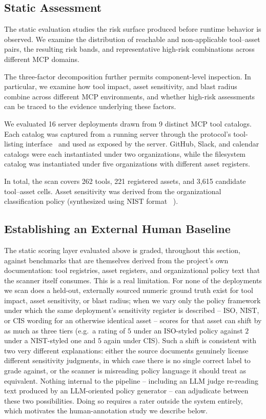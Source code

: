 \documentclass[sigconf]{acmart}
\begin{document}
\subsection{Static Assessment}
\label{sec:static-eval}

The static evaluation studies the risk surface produced before runtime
behavior is observed. We examine the distribution of reachable and
non-applicable tool--asset pairs, the resulting risk bands, and
representative high-risk combinations across different MCP domains.

The three-factor decomposition further permits component-level inspection. In particular, we examine how tool impact, asset sensitivity, and blast radius combine across different MCP environments, and whether high-risk assessments can be traced to the evidence underlying these factors.

We evaluated 16 server deployments drawn from 9 distinct MCP tool catalogs.
Each catalog was captured from a running server through the protocol's
tool-listing interface~\cite{mcp2026spec} and used as exposed by the server.
GitHub, Slack, and calendar catalogs were each instantiated under two
organizations, while the filesystem catalog was instantiated under five
organizations with different asset registers.

In total, the scan covers 262 tools, 221 registered assets, and
3,615 candidate tool--asset cells. Asset sensitivity was derived from
the organizational classification policy (synthesized using NIST format ~\cite{nist2008sp80060}).


\subsection{Establishing an External Human Baseline}
\label{sec:human-annotation}

The static scoring layer evaluated above is graded, throughout this section, against benchmarks that are themselves derived from the project's own documentation: tool registries, asset registers, and organizational policy text that the scanner itself consumes. This is a real limitation. For none of the deployments we scan does a held-out, externally sourced numeric ground truth exist for tool impact, asset sensitivity, or blast radius; when we vary only the policy framework under which the same deployment's sensitivity register is described -- ISO, NIST, or CIS wording for an otherwise identical asset -- scores for that asset can shift by as much as three tiers (e.g.\ a rating of $5$ under an ISO-styled policy against $2$ under a NIST-styled one and $5$ again under CIS). Such a shift is consistent with two very different explanations: either the source documents genuinely license different sensitivity judgments, in which case there is no single correct label to grade against, or the scanner is misreading policy language it should treat as equivalent. Nothing internal to the pipeline -- including an LLM judge re-reading text produced by an LLM-oriented policy generator -- can adjudicate between these two possibilities. Doing so requires a rater outside the system entirely, which motivates the human-annotation study we describe below.
\end{document}
